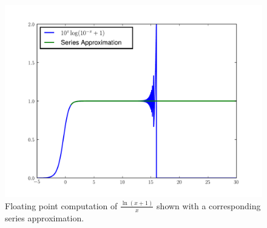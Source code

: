 \begin{figure}
\includegraphics[width=\textwidth]{lnseries.pdf}
\caption{Floating point computation of $\frac{\ln \left(x+1\right)}{x}$ shown with a corresponding series approximation.}
\label{floatbreak:lnseries}
\end{figure}

